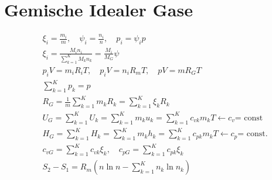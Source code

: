 \documentclass[twocolumn]{article}
\begin{document}
%                                             
                                                            
\section{Gemische Idealer Gase}

\begin{align*}
	&\xi_i
	= \frac{m_i}{m}, \quad \psi_i
	= \frac{n_i}{n}, \quad p_i
	= \psi_ip \\
	&\xi_i
	= \frac{M_i n_i}{\sum_{k
	= 1}^{K} M_kn_k}
	= \frac{M_i}{M_G}\psi  
	\\
	& p_iV
	= m_iR_iT, \quad p_iV
	= n_iR_mT, \quad pV
	= mR_GT \\
	& \sum_{k
	= 1}^{K} p_k
	= p 
	\\
	&R_G
	= \frac{1}{m} \sum_{k=1}^{K} m_kR_k
	= \sum_{k=1}^{K} \xi_k R_k 
	\\
	&U_G
	= \sum_{k=1}^{K} U_k
	= \sum_{k=1}^{K} m_k u_k
	= \sum_{k=1}^{K} c_{vk}m_kT \leftarrow \text{$c_v$
	= const}
	\\
	&H_G
	= \sum_{k=1}^{K} H_k
	= \sum_{k=1}^{K} m_k h_k
	= \sum_{k=1}^{K} c_{pk}m_kT \leftarrow \text{$c_p$
	= const.}
	\\
	&c_{vG}
	= \sum_{k=1}^{K} c_{vk} \xi_k, \quad c_{pG}
	= \sum_{k=1}^{K} c_{pk}\xi_k 
	\\
	&S_2-S_1
	= R_m \left( n \ln n - \sum_{k=1}^{K} n_k \ln n_k \right)
\end{align*}


\end{document}
